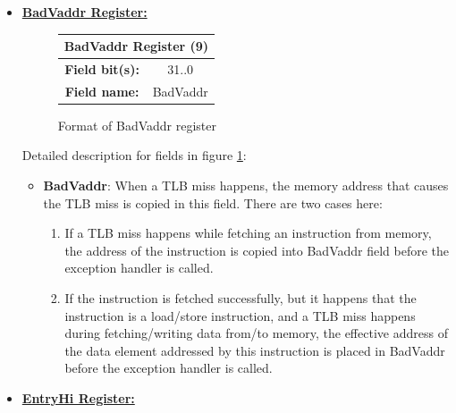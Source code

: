 \documentclass[oneside]{book}
\begin{document}
\begin{itemize}
\begin{itemize}
\end{itemize}

\item \textbf{\underline{BadVaddr Register:}}\\

\begin{figure}[H]
\begin{center}
\begin{tabular}{|c|c|}

\hline \multicolumn{2}{|c|}{BadVaddr Register (9)} \\

\hline \textbf{Field bit(s):} & 31..0    \\

\hline \textbf{Field name:}   & BadVaddr \\

\hline

\end{tabular}

\end{center}
\caption{Format of BadVaddr register}
\label{badvaddr_reg}
\end{figure}

Detailed description for fields in figure \ref{badvaddr_reg}:

\begin{itemize}

\item \textbf{BadVaddr}: When a TLB miss happens, the memory
      address that causes the TLB miss is copied in this
      field. There are two cases here:
      \begin{enumerate}
      \item If a TLB miss happens while fetching an instruction
            from memory, the address of the instruction is
            copied into BadVaddr field before the exception
            handler is called.
      \item If the instruction is fetched successfully, but it
            happens that the instruction is a load/store instruction,
            and a TLB miss happens during fetching/writing data
            from/to memory, the effective address of the data element
            addressed by this instruction is placed in BadVaddr before
            the exception handler is called.
      \end{enumerate}

\end{itemize}

\item \textbf{\underline{EntryHi Register:}}\\


\end{itemize}
\end{document}
